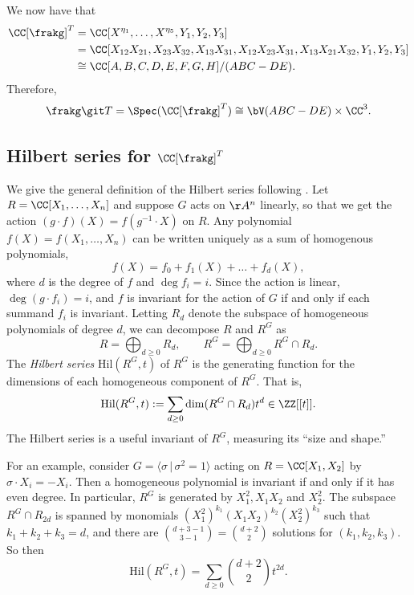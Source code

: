 \documentclass[12pt]{amsart}
\theoremstyle{plain}
\begin{document}
We now have that
\begin{align*}
	\CC[\frakg]^T &= \CC[X^{\eta_1}, \ldots, X^{\eta_5}, Y_1, Y_2, Y_3] \\
	&= \CC[X_{12} X_{21}, X_{23} X_{32}, X_{13} X_{31}, X_{12} X_{23} X_{31}, X_{13} X_{21} X_{32}, Y_1, Y_2, Y_3] \\
	&\cong \CC[A, B, C, D, E, F, G, H]/(ABC - DE).
\end{align*}
Therefore,
$$\frakg \git T = \Spec(\CC[\frakg]^T) \cong \bV(ABC - DE ) \times \CC^3.$$

\subsection{Hilbert series for $\CC[\frakg]^T$}
We give the general definition of the Hilbert series following \cite[\S 1.2]{Mukai03}.
Let $R = \CC[X_1, \ldots, X_n]$ and suppose $G$ acts on $\AA^n$ linearly, so that we get the action $(g\cdot f)(X) = f(g^{-1} \cdot X)$ on $R$.
Any polynomial $f(X) = f(X_1, \ldots, X_n)$ can be written uniquely as a sum of homogenous polynomials,
$$f(X) = f_0 + f_1(X) + \ldots + f_d(X),$$
where $d$ is the degree of $f$ and $\deg f_i = i$.
Since the action is linear, $\deg (g\cdot f_i) = i$, and $f$ is invariant for the action of $G$ if and only if each summand $f_i$ is invariant.
Letting $R_d$ denote the subspace of homogeneous polynomials of degree $d$, we can decompose $R$ and $R^G$ as
$$R = \bigoplus_{d \ge 0} R_d, \qquad R^G = \bigoplus_{d \ge 0} R^G \cap R_d.$$
The \emph{Hilbert series} $\mathrm{Hil}(R^G, t)$ of $R^G$ is the generating function for the dimensions of each homogeneous component of $R^G$.
That is,
$$\mathrm{Hil}(R^G, t):= \sum_{d \ge 0} \dim (R^G \cap R_d) t^d \in \ZZ[[t]].$$
The Hilbert series is a useful invariant of $R^G$, measuring its ``size and shape.''

For an example, consider $G = \langle \sigma \, | \, \sigma^2 = 1\rangle$ acting on $R = \CC[X_1, X_2]$ by $\sigma \cdot X_i = - X_i.$
Then a homogeneous polynomial is invariant if and only if it has even degree.
In particular, $R^G$ is generated by $X_1^2, X_1 X_2$ and $X_2^2$.
The subspace $R^G \cap R_{2d}$ is spanned by monomials $(X_1^2)^{k_1} (X_1 X_2)^{k_2} (X_2^2)^{k_3}$ such that $k_1 + k_2 + k_3 = d$, and there are ${d + 3 - 1 \choose 3 - 1} = {d + 2 \choose 2}$ solutions for $(k_1, k_2, k_3)$.
So then
$$\mathrm{Hil}(R^G, t) = \sum_{d \ge 0} {d + 2 \choose 2} t^{2d}.$$
\end{document}
